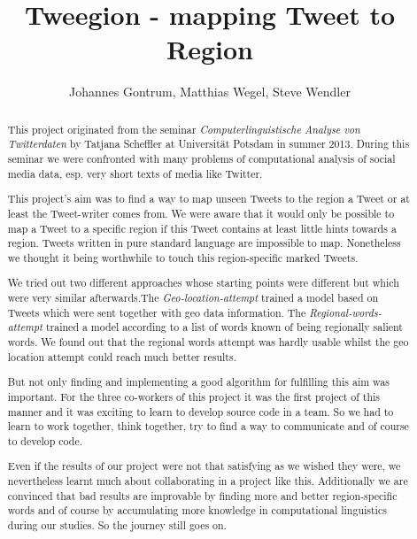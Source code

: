 \documentclass[11pt,notitlepage,oneside]{article}
\title{Tweegion - mapping Tweet to Region }
\author{Johannes Gontrum, Matthias Wegel, Steve Wendler}
\begin{document}
\maketitle

\begin{abstract}
This project originated from the seminar \textit{Computerlinguistische Analyse von Twitterdaten} by Tatjana Scheffler at Universität Potsdam in summer 2013. During this seminar we were confronted with many problems of computational analysis of social media data, esp. very short texts of media like Twitter.

This project's aim was to find a way to map unseen Tweets to the region a Tweet or at least the Tweet-writer comes from. We were aware that it would only be possible to map a Tweet to a specific region if this Tweet contains at least little hints towards a region. Tweets written in pure standard language are impossible to map. Nonetheless we thought it being worthwhile to touch this region-specific marked Tweets.

We tried out two different approaches whose starting points were different but which were very similar afterwards.The \emph{Geo-location-attempt} trained a model based on Tweets which were sent together with geo data information. The \emph{Regional-words-attempt} trained a model according to a list of words known of being regionally salient words. We found out that the regional words attempt was hardly usable whilst the geo location attempt could reach much better results.

But not only finding and implementing a good algorithm for fulfilling this aim was important. For the three co-workers of this project it was the first project of this manner and it was exciting to learn to develop source code in a team. So we had to learn to work together, think together, try to find a way to communicate and of course to develop code.

Even if the results of our project were not that satisfying as we wished they were, we nevertheless learnt much about collaborating in a project like this. Additionally we are convinced that bad results are improvable by finding more and better region-specific words and of course by accumulating more knowledge in computational linguistics during our studies. So the journey still goes on.
\end{abstract}
\newpage
\tableofcontents
\newpage

\newpage

\newpage

\newpage

\newpage

\printbibliography 
\end{document}
